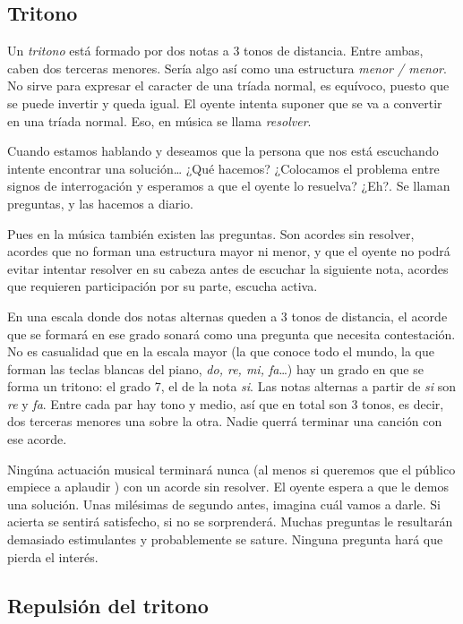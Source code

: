 \documentclass[]{article}
\begin{document}
\subsection{Tritono}

Un \emph{tritono} está formado por dos notas a 3 tonos de distancia. Entre ambas, caben dos terceras menores. Sería algo así como una estructura \emph{menor / menor}. No sirve para expresar el caracter de una tríada normal, es equívoco, puesto que se puede invertir y queda igual. El oyente intenta suponer que se va a convertir en una tríada normal. Eso, en música se llama \emph{resolver}.

Cuando estamos hablando y deseamos que la persona que nos está escuchando intente encontrar una solución\ldots{} ¿Qué hacemos? ¿Colocamos el problema entre signos de interrogación y esperamos a que el oyente lo resuelva? ¿Eh?. Se llaman preguntas, y las hacemos a diario.

Pues en la música también existen las preguntas. Son acordes sin resolver, acordes que no forman una estructura mayor ni menor, y que el oyente no podrá evitar intentar resolver en su cabeza antes de escuchar la siguiente nota, acordes que requieren participación por su parte, escucha activa.

En una escala donde dos notas alternas queden a 3 tonos de distancia, el acorde que se formará en ese grado sonará como una pregunta que necesita contestación. No es casualidad que en la escala mayor (la que conoce todo el mundo, la que forman las teclas blancas del piano, \emph{do, re,   mi, fa}\ldots) hay un grado en que se forma un tritono: el grado 7, el de la nota \emph{si}. Las notas alternas a partir de \emph{si} son \emph{re} y \emph{fa}. Entre cada par hay tono y medio, así que en total son 3 tonos, es decir, dos terceras menores una sobre la otra. Nadie querrá terminar una canción con ese acorde.

Ningúna actuación musical terminará nunca (al menos si queremos que el público empiece a aplaudir ) con un acorde sin resolver. El oyente espera a que le demos una solución. Unas milésimas de segundo antes, imagina cuál vamos a darle. Si acierta se sentirá satisfecho, si no se sorprenderá. Muchas preguntas le resultarán demasiado estimulantes y probablemente se sature. Ninguna pregunta hará que pierda el interés.

\subsection{Repulsión del tritono}
\end{document}
